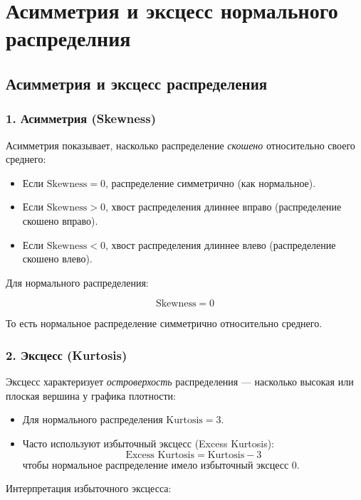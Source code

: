 \chapter{Асимметрия и эксцесс нормального распределния}
\label{ch:chap4}

\section*{Асимметрия и эксцесс распределения}

\subsection*{1. Асимметрия (Skewness)}

Асимметрия показывает, насколько распределение \emph{скошено} относительно своего среднего:

\begin{itemize}
    \item Если $\text{Skewness} = 0$, распределение симметрично (как нормальное).
    \item Если $\text{Skewness} > 0$, хвост распределения длиннее вправо (распределение скошено вправо).
    \item Если $\text{Skewness} < 0$, хвост распределения длиннее влево (распределение скошено влево).
\end{itemize}

Для нормального распределения:

\[
\text{Skewness} = 0
\]

То есть нормальное распределение симметрично относительно среднего.

\subsection*{2. Эксцесс (Kurtosis)}

Эксцесс характеризует \emph{островерхость} распределения — насколько высокая или плоская вершина у графика плотности:

\begin{itemize}
    \item Для нормального распределения $\text{Kurtosis} = 3$.
    \item Часто используют избыточный эксцесс (Excess Kurtosis):
    \[
    \text{Excess Kurtosis} = \text{Kurtosis} - 3
    \]
    чтобы нормальное распределение имело избыточный эксцесс $0$.
\end{itemize}

Интерпретация избыточного эксцесса:

